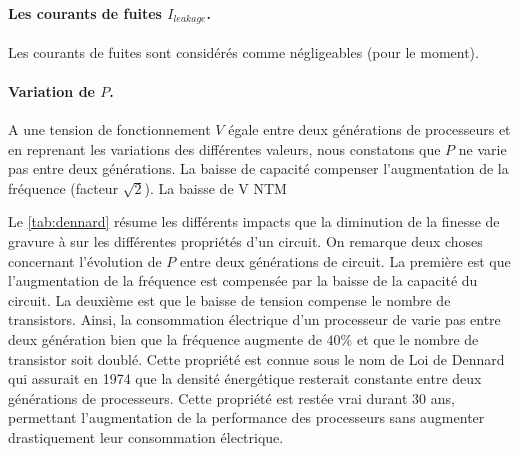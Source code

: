 \paragraph{Les courants de fuites $I_{leakage}$.} Les courants de fuites sont considérés comme négligeables (pour le moment). 

\paragraph{Variation de $P$.} A une tension de fonctionnement $V$ égale entre deux générations de processeurs et en reprenant les variations des différentes valeurs, nous constatons que $P$ ne varie pas entre deux générations. La baisse de capacité compenser l'augmentation de la fréquence (facteur $\sqrt{2}$). La baisse de V NTM 


\begin{table}[]
\centering
{}
\caption{ Résumé des impacts de la diminution de la finesse de gravure d'un facteur $\sqrt{2}$\protect\footnotemark.}
\label{tab:dennard}
\end{table}


Le \autoref{tab:dennard} résume les différents impacts que la diminution de la finesse de gravure à sur les différentes propriétés d'un circuit. On remarque deux choses concernant l'évolution de $P$ entre deux générations de circuit. La première est que l'augmentation de la fréquence est compensée par la baisse de la capacité du circuit. La deuxième est que le baisse de tension compense le nombre de transistors. Ainsi, la consommation électrique d'un processeur de varie pas entre deux génération bien que la fréquence augmente de $40\%$ et que le nombre de transistor soit doublé. Cette propriété est connue sous le nom de Loi de Dennard \cite{Dennard1974} qui assurait en 1974 que la densité énergétique resterait constante entre deux générations de processeurs. Cette propriété est restée vrai durant 30 ans, permettant l'augmentation de la performance des processeurs sans augmenter drastiquement leur consommation électrique. 




